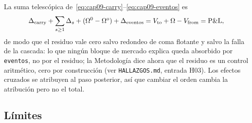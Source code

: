 La suma telescópica de~\eqref{eq:cap09-carry}--\eqref{eq:cap09-eventos} es
\begin{equation}\label{eq:cap09-telescopio}
  \Delta_{\mathrm{carry}}+\sum_{s\ge1}\Delta_s+(\Omega^{0}-\Omega^{\mathrm{o}})+\Delta_{\mathrm{eventos}}=V_{\mathrm{to}}+\Omega-V_{\mathrm{from}}=\mathrm{P\&L},
\end{equation}
de modo que el residuo vale cero salvo redondeo de coma flotante y salvo la falla de la cascada: lo que ningún bloque de mercado explica queda absorbido por \texttt{eventos}, no por el residuo; la Metodología dice ahora que el residuo es un control aritmético, cero por construcción (ver \texttt{HALLAZGOS.md}, entrada H03). Los efectos cruzados se atribuyen al paso posterior, así que cambiar el orden cambia la atribución pero no el total.

\subsection{Límites}\label{sec:cap09-limites-calc}

